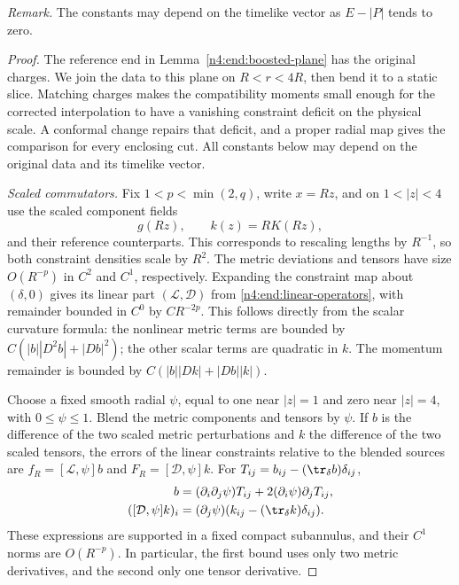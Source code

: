 \noindent\emph{Remark.} The constants may depend on the timelike vector
as \(E-|P|\) tends to zero.

\begin{proof}
The reference end in Lemma~\ref{n4:end:boosted-plane} has the original
charges. We join the data to this plane on \(R<r<4R\), then bend it to
a static slice. Matching charges makes the compatibility moments small
enough for the corrected interpolation to have a vanishing constraint
deficit on the physical scale. A conformal change repairs that deficit,
and a proper radial map gives the comparison for every enclosing cut.
All constants below may depend on the original data and its timelike
vector.

\smallskip
\noindent\emph{Scaled commutators.} Fix \(1<p<\min(2,q)\), write \(x=Rz\), and on
\(1<|z|<4\) use the scaled component fields
\[
 g(Rz),\qquad k(z)=RK(Rz),
\]
and their reference counterparts. This corresponds to rescaling lengths
by \(R^{-1}\), so both constraint densities scale by \(R^2\).
The metric deviations and tensors have size \(O(R^{-p})\) in
\(C^2\) and \(C^1\), respectively. Expanding the constraint map about
\((\delta,0)\) gives its linear part
\((\mathcal L,\mathcal D)\) from \eqref{n4:end:linear-operators}, with
remainder bounded in \(C^0\) by \(CR^{-2p}\). This follows directly
from the scalar curvature formula: the nonlinear metric terms are
bounded by \(C(|b||D^2b|+|Db|^2)\); the other scalar terms are quadratic
in \(k\). The momentum remainder is bounded by
\(C(|b||Dk|+|Db||k|)\).

Choose a fixed smooth radial \(\psi\), equal to one near \(|z|=1\)
and zero near \(|z|=4\), with \(0\le\psi\le1\). Blend the metric
components and tensors by \(\psi\). If \(b\) is the difference of
the two scaled metric perturbations and \(k\) the difference of the
two scaled tensors, the errors of the linear constraints relative to
the blended sources are
\(f_R=[\mathcal L,\psi]b\) and
\(F_R=[\mathcal D,\psi]k\). For \(T_{ij}=b_{ij}-(\tr_\delta b)\delta_{ij}\),
\begin{align}
 [\mathcal L,\psi]b
   &=(\partial_i\partial_j\psi)T_{ij}
       +2(\partial_i\psi)\partial_jT_{ij},\label{n4:end:scalar-commutator}\\
 ([\mathcal D,\psi]k)_i
   &=(\partial_j\psi)(k_{ij}-(\tr_\delta k)\delta_{ij}).
       \label{n4:end:vector-commutator}
\end{align}
These expressions are supported in a fixed compact subannulus, and
their \(C^1\) norms are \(O(R^{-p})\). In particular, the first bound
uses only two metric derivatives, and the second only one tensor
derivative.


\end{proof}
